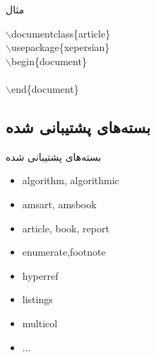 \begin{plainslide}
\begin{block}{مثال}
\begin{latin}
$\backslash$documentclass\{article\}\\
{$\backslash$usepackage\{xepersian\}}\\
$\backslash$begin\{document\}\\
\hfill{}\\
$\backslash$end\{document\}\\
\end{latin}
\end{block}
\end{plainslide}


\subsection{بسته‌های پشتیبانی شده}
\begin{plainslide}%
\begin{block}{بسته‌های پشتیبانی شده}
\begin{latin}
\begin{itemize}
\item algorithm, algorithmic
\item amsart, amsbook
\item article, book, report
\item enumerate,footnote
\item hyperref
\item listings
\item multicol
\item ...
\end{itemize}
\end{latin}
\end{block}
\end{plainslide}

